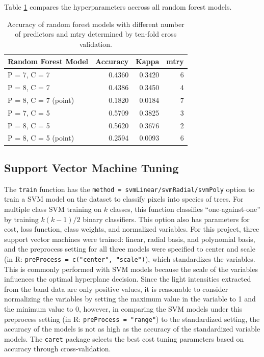 \documentclass[12pt,twoside]{reedthesis}
\begin{document}
Table \ref{tab:resultsRF} compares the hyperparameters accross all random forest models.
\begin{table}

\caption{\label{tab:resultsRF}Accuracy of random forest models with different number of predictors and mtry determined by ten-fold cross validation.}
\centering
\begin{tabular}[t]{l|r|r|r}
\hline
Random Forest Model & Accuracy & Kappa & mtry\\
\hline
P = 7, C = 7 & 0.4360 & 0.3420 & 6\\
\hline
P = 8, C = 7 & 0.4386 & 0.3450 & 4\\
\hline
P = 8, C = 7 (point) & 0.1820 & 0.0184 & 7\\
\hline
P = 7, C = 5 & 0.5709 & 0.3825 & 3\\
\hline
P = 8, C = 5 & 0.5620 & 0.3676 & 2\\
\hline
P = 8, C = 5 (point) & 0.2594 & 0.0093 & 6\\
\hline
\end{tabular}
\end{table}
\hypertarget{support-vector-machine-tuning}{%
\subsection{Support Vector Machine Tuning}\label{support-vector-machine-tuning}}

The \texttt{train} function has the \texttt{method\ =\ svmLinear/svmRadial/svmPoly} option to train a SVM model on the dataset to classify pixels into species of trees. For multiple class SVM training on \(k\) classes, this function classifies ``one-against-one'' by training \(k(k - 1)/2\) binary classifiers. This option also has parameters for cost, loss function, class weights, and normalized variables. For this project, three support vector machines were trained: linear, radial basis, and polynomial basis, and the preprocess setting for all three models were specified to center and scale (in R: \texttt{preProcess\ =\ c("center",\ "scale")}), which standardizes the variables. This is commonly performed with SVM models because the scale of the variables influences the optimal hyperplane decision. Since the light intensities extracted from the band data are only positive values, it is reasonable to consider normalizing the variables by setting the maximum value in the variable to 1 and the minimum value to 0, however, in comparing the SVM models under this preprocess setting (in R: \texttt{preProcess\ =\ "range"}) to the standardized setting, the accuracy of the models is not as high as the accuracy of the standardized variable models. The \texttt{caret} package selects the best cost tuning parameters based on accuracy through cross-validation.
\end{document}
